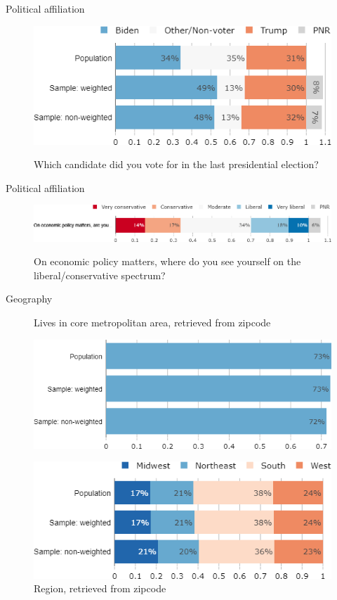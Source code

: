 \documentclass[aspectratio=169,9pt,dvipsnames]{beamer}
\begin{document}
\begin{frame}{Political affiliation}%
\begin{figure}[h!]
\centering
\caption{Which candidate did you vote for in the last presidential election?}
\includegraphics[width=.7\textwidth]{../figures/US/vote_US_comp.png} \\
\end{figure}
\end{frame}

\begin{frame}{Political affiliation}%
\begin{figure}[h!]
\centering
\caption{On economic policy matters, where do you see yourself on the liberal/conservative spectrum?}
\includegraphics[width=\textwidth]{../figures/US/liberal_conservative_US.png} \\
\end{figure}
\end{frame}

\begin{frame}{Geography}%
\begin{figure}[h!]
\centering
\caption{Lives in core metropolitan area, retrieved from zipcode}
\includegraphics[width=.5\textwidth]{../figures/US/core_metropolitan_US_comp.png} \\
\vspace{.2cm}
\caption{Region, retrieved from zipcode}
\includegraphics[width=.5\textwidth]{../figures/US/region_US_comp.png}
\end{figure}
\end{frame}
\end{document}
